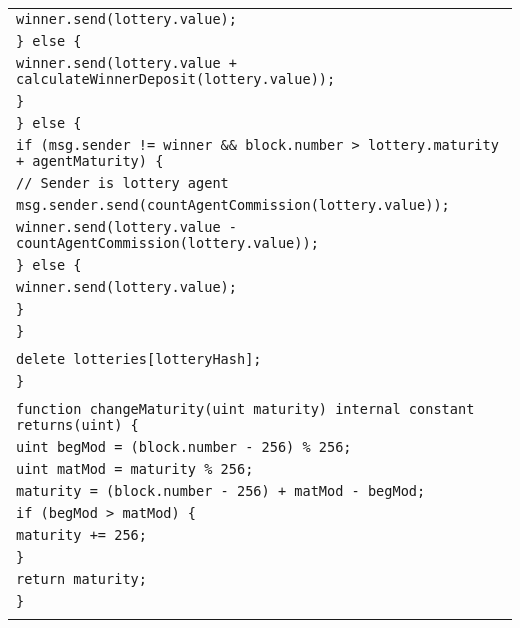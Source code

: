 \documentclass[a4paper]{article}
\begin{document}
\begin{tabularx}{\linewidth}{l}
        \qquad\qquad\qquad\qquad\texttt{winner.send(lottery.value);}\\
        \qquad\qquad\qquad\texttt{\} else \{}\\
        \qquad\qquad\qquad\qquad\texttt{winner.send(lottery.value + calculateWinnerDeposit(lottery.value));}\\
        \qquad\qquad\qquad\texttt{\}}\\
        \qquad\qquad\texttt{\} else \{}\\
        \qquad\qquad\qquad\texttt{if (msg.sender != winner \&\& block.number > lottery.maturity + agentMaturity) \{}\\
        \qquad\qquad\qquad\qquad\texttt{// Sender is~lottery agent}\\
        \qquad\qquad\qquad\qquad\texttt{msg.sender.send(countAgentCommission(lottery.value));}\\
        \qquad\qquad\qquad\qquad\texttt{winner.send(lottery.value - countAgentCommission(lottery.value));}\\
        \qquad\qquad\qquad\texttt{\} else \{}\\
        \qquad\qquad\qquad\qquad\texttt{winner.send(lottery.value);}\\
        \qquad\qquad\qquad\texttt{\}}\\
        \qquad\qquad\texttt{\}}\\
        \\
        \qquad\qquad\texttt{delete lotteries[lotteryHash];}\\
        \qquad\texttt{\}}\\
        \\
        \qquad\texttt{function changeMaturity(uint maturity) internal constant returns(uint) \{}\\
        \qquad\qquad\texttt{uint begMod = (block.number - 256) \% 256;}\\
        \qquad\qquad\texttt{uint matMod = maturity \% 256;}\\
        \qquad\qquad\texttt{maturity = (block.number - 256) + matMod - begMod;}\\
        \qquad\qquad\texttt{if (begMod > matMod) \{}\\
        \qquad\qquad\qquad\texttt{maturity += 256;}\\
        \qquad\qquad\texttt{\}}\\
        \qquad\qquad\texttt{return maturity;}\\
        \qquad\texttt{\}}\\
        \\

\end{tabularx}
\end{document}
